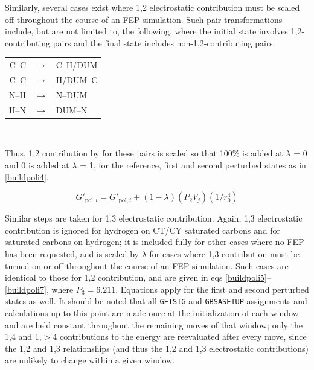 \documentclass[12pt]{report}
\begin{document}
Similarly, several cases exist where 1,2 electrostatic contribution must be scaled off throughout the course of an FEP simulation. Such pair transformations include, but are not limited to, the following, where the initial state involves 1,2-contributing pairs and the final state includes non-1,2-contributing pairs.

\vspace*{.4cm}
\begin{singlespace}
{\centering
\begin{tabular}{rcl}
C--C & $\longrightarrow$ & C--H/DUM \\ 
C--C & $\longrightarrow$ & H/DUM--C \\
N--H & $\longrightarrow$ & N--DUM \\
H--N & $\longrightarrow$ & DUM--N \\
\end{tabular}\\}
\end{singlespace}
\vspace*{.6cm}

Thus, 1,2 contribution by for these pairs is scaled so that 100\% is added at $\lambda$ = 0 and 0 is added at $\lambda$ = 1, for the reference, first and second perturbed states as in \cref{buildpoli4}.

\vspace*{-.4cm}
\begin{equation}
\label{buildpoli4}
G'_{ \textrm{pol},i} = G'_{ \textrm{pol},i} + (1 - \lambda)(P_{2}V_{j})(1/r^{4}_{0})
\end{equation}
\vspace*{-0.6cm}

Similar steps are taken for 1,3 electrostatic contribution. Again, 1,3 electrostatic contribution is ignored for hydrogen on CT/CY saturated carbons and for saturated carbons on hydrogen; it is included fully for other cases where no FEP has been requested, and is scaled by $\lambda$ for cases where 1,3 contribution must be turned on or off throughout the course of an FEP simulation. Such cases are identical to those for 1,2 contribution, and are given in eqs \ref{buildpoli5}--\ref{buildpoli7}, where $P_{3} = 6.211$. Equations apply for the first and second perturbed states as well. It should be noted that all {\tt GETSIG} and {\tt GBSASETUP} assignments and calculations up to this point are made once at the initialization of each window and are held constant throughout the remaining moves of that window; only the 1,4 and 1,$>$4 contributions to the energy are reevaluated after every move, since the 1,2 and 1,3 relationships (and thus the 1,2 and 1,3 electrostatic contributions) are unlikely to change within a given window.
\end{document}
